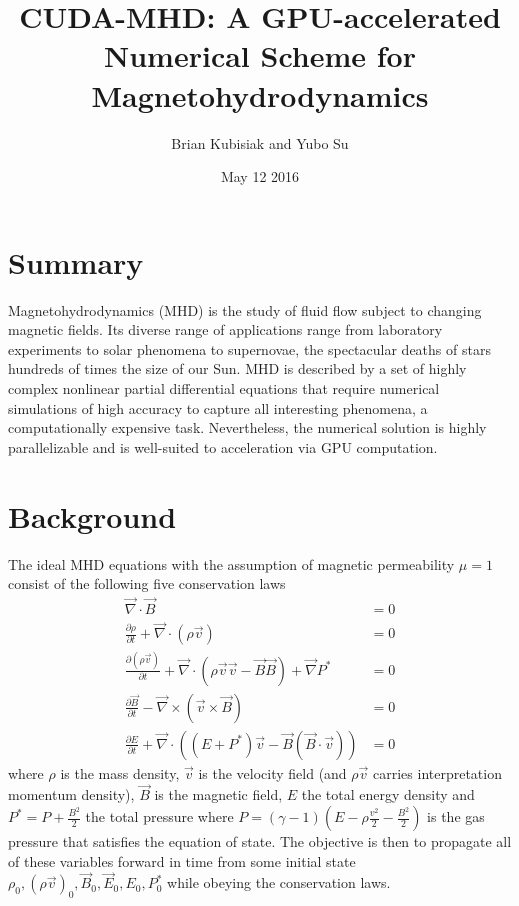 \documentclass[10pt]{article}
\newcommand{\pd}[2]{\frac{\partial#1}{\partial#2}}
\begin{document}
\pagestyle{fancy}
\cfoot{\thepage/\pageref{LastPage}}

\title{CUDA-MHD: A GPU-accelerated Numerical Scheme for Magnetohydrodynamics}
\author{Brian Kubisiak and Yubo Su}
\date{May 12 2016}
\maketitle

\section{Summary}

Magnetohydrodynamics (MHD) is the study of fluid flow subject to changing magnetic fields. Its diverse range of applications range from laboratory experiments to solar phenomena to supernovae, the spectacular deaths of stars hundreds of times the size of our Sun. MHD is described by a set of highly complex nonlinear partial differential equations that require numerical simulations of high accuracy to capture all interesting phenomena, a computationally expensive task. Nevertheless, the numerical solution is highly parallelizable and is well-suited to acceleration via GPU computation.

\section{Background}

The ideal MHD equations with the assumption of magnetic permeability $\mu = 1$ consist of the following five conservation laws
\begin{align}
    \vec{\nabla} \cdot \vec{B} &= 0 \nonumber\\
    \pd{\rho}{t} + \vec{\nabla} \cdot \left( \rho \vec{v} \right) &= 0 \nonumber\\
    \pd{(\rho \vec{v})}{t} + \vec{\nabla} \cdot \left( \rho \vec{v}\vec{v} - \vec{B} \vec{B} \right) + \vec{\nabla}P^* &= 0 \nonumber\\
    \pd{\vec{B}}{t} - \vec{\nabla} \times \left( \vec{v} \times \vec{B} \right) &= 0 \nonumber\\
    \pd{E}{t} + \vec{\nabla} \cdot \left( (E + P^*)\vec{v} - \vec{B}\left( \vec{B} \cdot \vec{v} \right) \right) &= 0
\end{align}
where $\rho$ is the mass density, $\vec{v}$ is the velocity field (and $\rho \vec{v}$ carries interpretation momentum density), $\vec{B}$ is the magnetic field, $E$ the total energy density and $P^* = P + \frac{B^2}{2}$ the total pressure where $P = (\gamma - 1)\left( E - \rho \frac{v^2}{2} - \frac{B^2}{2} \right)$ is the gas pressure that satisfies the equation of state. The objective is then to propagate all of these variables forward in time from some initial state $\rho_0, (\rho \vec{v})_0, \vec{B}_0, \vec{E}_0, E_0, P^*_0$ while obeying the conservation laws.
\end{document}
